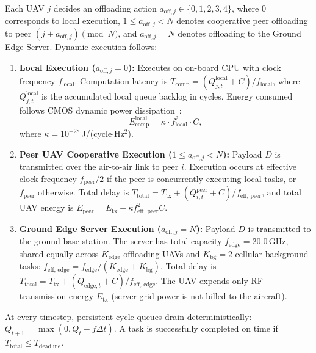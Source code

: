 \documentclass[conference]{IEEEtran}
\begin{document}
Each UAV $j$ decides an offloading action $a_{\text{off}, j} \in \{0, 1, 2, 3, 4\}$, where $0$ corresponds to local execution, $1 \le a_{\text{off}, j} < N$ denotes cooperative peer offloading to peer $(j + a_{\text{off}, j}) \pmod N$, and $a_{\text{off}, j} = N$ denotes offloading to the Ground Edge Server. Dynamic execution follows:
\begin{enumerate}
    \item \textbf{Local Execution ($a_{\text{off}, j} = 0$):} Executes on on-board CPU with clock frequency $f_{\text{local}}$. Computation latency is $T_{\text{comp}} = (Q_{j, t}^{\text{local}} + C) / f_{\text{local}}$, where $Q_{j, t}^{\text{local}}$ is the accumulated local queue backlog in cycles. Energy consumed follows CMOS dynamic power dissipation~\cite{burd1996processor}:
    \begin{equation}
    E_{\text{comp}}^{\text{local}} = \kappa \cdot f_{\text{local}}^2 \cdot C,
    \end{equation}
    where $\kappa = 10^{-28}$\,J/(cycle$\cdot$Hz$^2$).
    \item \textbf{Peer UAV Cooperative Execution ($1 \le a_{\text{off}, j} < N$):} Payload $D$ is transmitted over the air-to-air link to peer $i$. Execution occurs at effective clock frequency $f_{\text{peer}} / 2$ if the peer is concurrently executing local tasks, or $f_{\text{peer}}$ otherwise. Total delay is $T_{\text{total}} = T_{\text{tx}} + (Q_{i, t}^{\text{peer}} + C) / f_{\text{eff, peer}}$, and total UAV energy is $E_{\text{peer}} = E_{\text{tx}} + \kappa f_{\text{eff, peer}}^2 C$.
    \item \textbf{Ground Edge Server Execution ($a_{\text{off}, j} = N$):} Payload $D$ is transmitted to the ground base station. The server has total capacity $f_{\text{edge}} = 20.0$\,GHz, shared equally across $K_{\text{edge}}$ offloading UAVs and $K_{\text{bg}} = 2$ cellular background tasks: $f_{\text{eff, edge}} = f_{\text{edge}} / (K_{\text{edge}} + K_{\text{bg}})$. Total delay is $T_{\text{total}} = T_{\text{tx}} + (Q_{\text{edge}, t} + C) / f_{\text{eff, edge}}$. The UAV expends only RF transmission energy $E_{\text{tx}}$ (server grid power is not billed to the aircraft).
\end{enumerate}
At every timestep, persistent cycle queues drain deterministically: $Q_{t+1} = \max(0, Q_t - f \Delta t)$. A task is successfully completed on time if $T_{\text{total}} \le T_{\text{deadline}}$.
\end{document}
